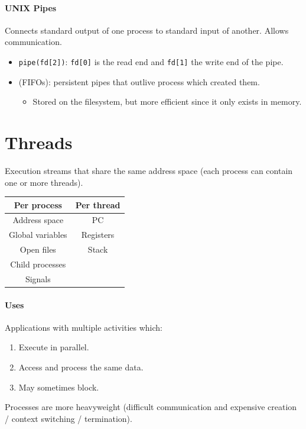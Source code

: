 \documentclass[twocolumn,english]{article}
\providecommand{\tabularnewline}{\\}
\providecommand{\tabularnewline}{\\}
\let\emph\relax
\begin{document}
\paragraph{UNIX Pipes}

Connects standard output of one process to standard input of another.
Allows \emph{one-way} communication.
\begin{itemize}
\item \texttt{pipe(fd{[}2{]})}: \texttt{fd{[}0{]}} is the read end and \texttt{fd{[}1{]}}
the write end of the pipe.
\item \emph{Named pipes} (FIFOs): persistent pipes that outlive process
which created them.
\begin{itemize}
\item Stored on the filesystem, but more efficient since it only exists
in memory.
\end{itemize}
\end{itemize}

\section{Threads}

Execution streams that share the same address space (each process
can contain one or more threads).

\begin{table}[H]
\centering{}%
\begin{tabular}{cc}
\toprule 
\textbf{Per process} & \textbf{Per thread}\tabularnewline
\midrule
Address space & PC\tabularnewline
Global variables & Registers\tabularnewline
Open files & Stack\tabularnewline
Child processes & \tabularnewline
Signals & \tabularnewline
\bottomrule
\end{tabular}
\end{table}

\paragraph{Uses}

Applications with multiple activities which:
\begin{enumerate}
\item Execute in parallel.
\item Access and process the same data.
\item May sometimes block.
\end{enumerate}
Processes are more heavyweight (difficult communication and expensive
creation / context switching / termination).
\end{document}

